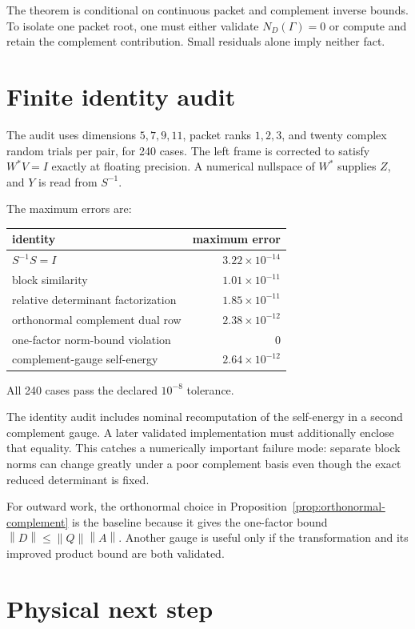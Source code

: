 \documentclass[12pt]{article}
\theoremstyle{remark}
\newcommand{\norm}[1]{\left\lVert#1\right\rVert}
\begin{document}
The theorem is conditional on continuous packet and complement inverse
bounds.  To isolate one packet root, one must either validate
$N_D(\Gamma)=0$ or compute and retain the complement contribution.  Small
residuals alone imply neither fact.

\section{Finite identity audit}

The audit uses dimensions $5,7,9,11$, packet ranks $1,2,3$, and twenty
complex random trials per pair, for 240 cases.  The left frame is corrected
to satisfy $W^*V=I$ exactly at floating precision.  A numerical nullspace of
$W^*$ supplies $Z$, and $Y$ is read from $S^{-1}$.

The maximum errors are:
\begin{center}
\begin{tabular}{lr}
\toprule
identity & maximum error\\
\midrule
$S^{-1}S=I$ & $3.22\times10^{-14}$\\
block similarity & $1.01\times10^{-11}$\\
relative determinant factorization & $1.85\times10^{-11}$\\
orthonormal complement dual row & $2.38\times10^{-12}$\\
one-factor norm-bound violation & $0$\\
complement-gauge self-energy & $2.64\times10^{-12}$\\
\bottomrule
\end{tabular}
\end{center}
All 240 cases pass the declared $10^{-8}$ tolerance.

The identity audit includes nominal recomputation of the self-energy in a
second complement gauge.  A later validated implementation must additionally
enclose that equality.  This catches a numerically important failure mode:
separate block norms can change greatly under a poor complement basis even
though the exact reduced determinant is fixed.

For outward work, the orthonormal choice in
Proposition~\ref{prop:orthonormal-complement} is the baseline because it
gives the one-factor bound $\norm D\le\norm Q\norm A$.  Another gauge is
useful only if the transformation and its improved product bound are both
validated.

\section{Physical next step}
\end{document}
